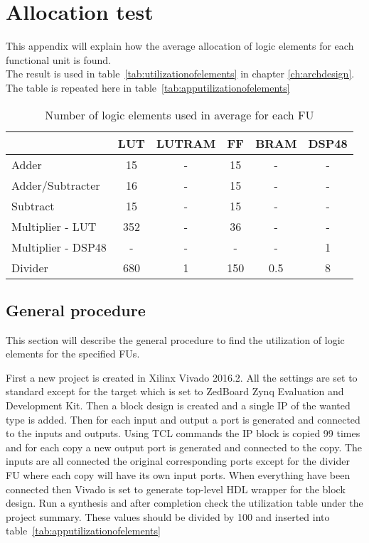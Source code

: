 \chapter{Allocation test}
This appendix will explain how the average allocation of logic elements for each functional unit is found.\\
The result is used in table~\vref{tab:utilizationofelements} in chapter \ref{ch:archdesign}. The table is repeated here in table~\vref{tab:apputilizationofelements}

\begin{table}[ht!]
\centering
\begin{tabular}{l | c c c c c }
  \toprule
   &  LUT & LUTRAM & FF & BRAM & DSP48 \\
  \midrule
  Adder & 15 & - & 15 & - & - \\
  Adder/Subtracter  & 16 & - & 15 & - & - \\
  Subtract  & 15 & - & 15 & - & - \\
  Multiplier - LUT  & 352 & - & 36 & - & - \\
  Multiplier - DSP48 & - & - & - & - & 1 \\
  Divider & 680 & 1 & 150 & 0.5 & 8 \\
  \bottomrule
\end{tabular}
\caption{Number of logic elements used in average for each FU}
\label{tab:apputilizationofelements}
\end{table}

\section{General procedure}
This section will describe the general procedure to find the utilization of logic elements for the specified FUs. 

First a new project is created in Xilinx Vivado 2016.2. All the settings are set to standard except for the target which is set to ZedBoard Zynq Evaluation and Development Kit. Then a block design is created and a single IP of the wanted type is added. Then for each input and output a port is generated and connected to the inputs and outputs. Using TCL commands the IP block is copied 99 times and for each copy a new output port is generated and connected to the copy. The inputs are all connected the original corresponding ports except for the divider FU where each copy will have its own input ports. When everything have been connected then Vivado is set to generate top-level HDL wrapper for the block design. Run a synthesis and after completion check the utilization table under the project summary. These values should be divided by 100 and inserted into table~\vref{tab:apputilizationofelements}

